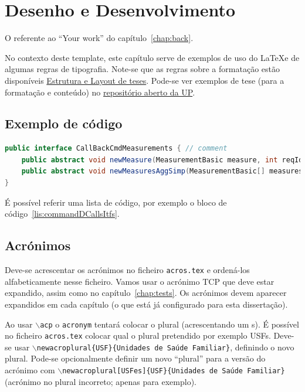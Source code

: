 \chapter{Desenho e Desenvolvimento}\label{chap:devel}

O referente ao ``Your work'' do capítulo~\ref{chap:back}.

No contexto deste template, este capítulo serve de exemplos de uso do \LaTeX e 
de algumas regras de tipografia. Note-se que as regras sobre a formatação estão 
disponíveis 
\href{https://sigarra.up.pt/fcup/pt/conteudos_geral.ver?pct_pag_id=1011511&pct_parametros=pv_unidade=97&pct_grupo=33673&pct_grupo=33670&pct_grupo=33675&pct_grupo=33683&pct_grupo=36711#36711}{Estrutura 
e Layout de teses}. Pode-se ver exemplos de tese (para a formatação e conteúdo) 
no \href{https://repositorio-aberto.up.pt/handle/10216/9535}{repositório aberto 
da UP}.

\section{Exemplo de código}

\begin{lstlisting}[numbers=none,language=java,caption={[CommandDaemonCallsItf]
   {CommandDaemon} callback interfaces},label=lis:commandDCallsItfs,float=htb]
public interface CallBackCmdMeasurements { // comment
	public abstract void newMeasure(MeasurementBasic measure, int reqId);
	public abstract void newMeasuresAggSimp(MeasurementBasic[] measuresAggSimp, 'A string');
}
\end{lstlisting}

É possível referir uma lista de código, por exemplo o bloco de código~\ref{lis:commandDCallsItfs}.

\section{Acrónimos}

Deve-se acrescentar os acrónimos no ficheiro \texttt{acros.tex} e ordená-los 
alfabeticamente nesse ficheiro.
Vamos usar o acrónimo \ac{TCP} que deve estar expandido, assim como no 
capítulo~\ref{chap:tests}. Os acrónimos devem aparecer expandidos em cada 
capítulo (o que está já configurado para esta dissertação).

Ao usar $\backslash$\texttt{acp} o \texttt{acronym} tentará colocar o plural 
(acrescentando um s). É possível no ficheiro \texttt{acros.tex} colocar qual o 
plural pretendido por exemplo \acp{USF}. Deve-se usar 
$\backslash$\texttt{newacroplural\{USF\}\{Unidades de Saúde Familiar\}}, 
definindo o novo plural. Pode-se opcionalmente definir um novo ``plural'' para a 
versão do acrónimo com $\backslash$\texttt{newacroplural[USFes]\{USF\}\{Unidades 
de Saúde Familiar\}} (acrónimo no plural incorreto; apenas para exemplo).


